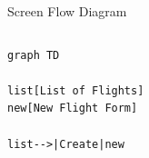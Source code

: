 \documentclass[aspectratio=43,handout,bigger]{beamer}
\begin{document}

\begin{frame}[fragile]{Screen Flow Diagram}
  \begin{columns}
    \begin{column}{.5\textwidth}
\begin{verbatim}
graph TD

list[List of Flights]
new[New Flight Form]

list-->|Create|new
\end{verbatim}
\end{column}
\begin{column}{.5\textwidth}
\end{column}
\end{columns}
\end{frame}

\end{document}
